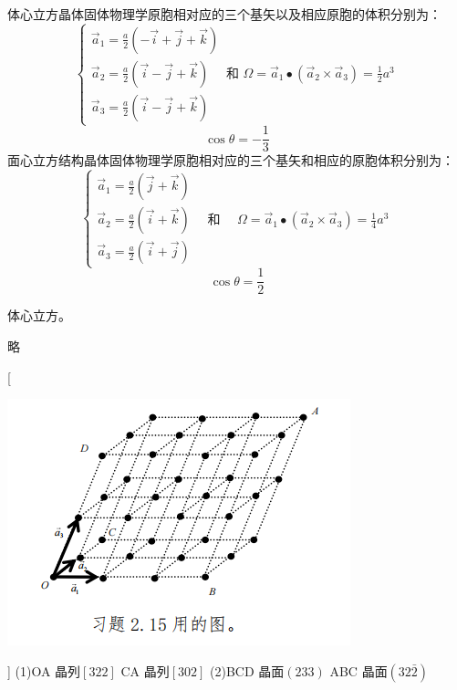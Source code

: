 \documentclass[UTF8,12pt, a4paper, oneside]{ctexart}
\begin{document}
    {体心立方晶体固体物理学原胞相对应的三个基矢以及相应原胞的体积分别为：\[\left\{\begin{array}{l}
     \vec{a}_{1}=\frac{a}{2}(-\vec{i}+\vec{j}+\vec{k}) \\
     \vec{a}_{2}=\frac{a}{2}(\vec{i}-\vec{j}+\vec{k}) \quad \text { 和 } \Omega=\vec{a}_{1} \bullet\left(\vec{a}_{2} \times \vec{a}_{3}\right)=\frac{1}{2} a^{3} \\
     \vec{a}_{3}=\frac{a}{2}(\vec{i}-\vec{j}+\vec{k}) 
    \end{array}\right.\]  \[\cos \theta=-\frac{1}{3}\] 面心立方结构晶体固体物理学原胞相对应的三个基矢和相应的原胞体积分别为：\[\left\{\begin{array}{l}
    \vec{a}_{1}=\frac{a}{2}(\vec{j}+\vec{k}) \\
    \vec{a}_{2}=\frac{a}{2}(\vec{i}+\vec{k}) \quad \text { 和 } \quad \Omega=\vec{a}_{1} \bullet\left(\vec{a}_{2} \times \vec{a}_{3}\right)=\frac{1}{4} a^{3}  \\
     \vec{a}_{3}=\frac{a}{2}(\vec{i}+\vec{j}) 
     \end{array}\right.\] \[ \cos \theta=\frac{1}{2}\]}

    {体心立方。}

    {略}

    [\begin{center} \includegraphics{picture/2-15.png} \end{center}]
    {(1)OA 晶列$[322]$  CA 晶列$[302]$\newline
    (2)BCD 晶面$(233)$ ABC 晶面$(32\bar{2})$}
\end{document}
